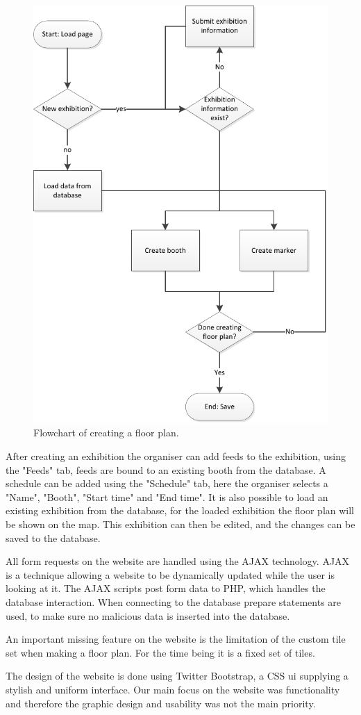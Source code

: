 \begin{figure}[H]
	\centering
	\includegraphics[width=0.7\linewidth]{img/floorplanflow.pdf}
	\caption{Flowchart of creating a floor plan.\label{fig:floorplan}}
\end{figure}

After creating an exhibition the organiser can add feeds to the exhibition, using the "Feeds" tab, feeds are bound to an existing booth from the database. A schedule can be added using the "Schedule" tab, here the organiser selects a "Name", "Booth", "Start time" and "End time".
It is also possible to load an existing exhibition from the database, for the loaded exhibition the floor plan will be shown on the map. This exhibition can then be edited, and the changes can be saved to the database.

All form requests on the website are handled using the AJAX technology\citep{ajax}. AJAX is a technique allowing a website to be dynamically updated while the user is looking at it. The AJAX scripts post form data to PHP, which handles the database interaction. When connecting to the database prepare statements are used, to make sure no malicious data is inserted into the database.

An important missing feature on the website is the limitation of the custom tile set when making a floor plan. For the time being it is a fixed set of tiles.

The design of the website is done using Twitter Bootstrap\citep{twitterbootstrap}, a CSS \ac{ui} supplying a stylish and uniform interface.
Our main focus on the website was functionality and therefore the graphic design and usability was not the main priority.
